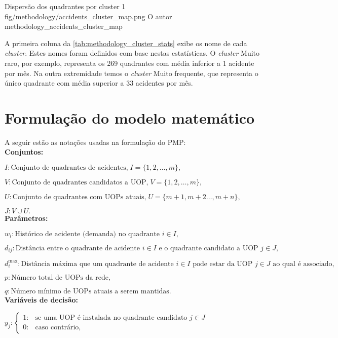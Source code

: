 \figurah
{Dispersão dos quadrantes por cluster}
{1}
{fig/methodology/accidents_cluster_map.png}
{O autor}
{methodology_accidents_cluster_map}
{}
{}

A primeira coluna da \autoref{tab:methodology_cluster_stats} exibe os nome de cada \textit{cluster}. Estes nomes foram definidos com base nestas estatísticas. O \textit{cluster} Muito raro, por exemplo, representa os 269 quadrantes com média inferior a 1 acidente por mês. Na outra extremidade temos o \textit{cluster} Muito frequente, que representa o único quadrante com média superior a 33 acidentes por mês.

\section{Formulação do modelo matemático}\label{sec:model_formulation}

A seguir estão as notações usadas na formulação do PMP: \\

\hline
\textbf{Conjuntos:}

$I \colon \text{Conjunto de quadrantes de acidentes,} \; I = \{1,2,\ldots,m\}\text{,}$

$V \colon \text{Conjunto de quadrantes candidatos a UOP,} \; V = \{1,2,\ldots,m\}\text{,}$

$U \colon \text{Conjunto de quadrantes com UOPs atuais,} \; U = \{m+1, m+2 \ldots, m + n\}\text{,}$

$J \colon V \cup U.$ \\

\hline
\textbf{Parâmetros:}

$w_i \colon \text{Histórico de acidente (demanda) no quadrante }i \in I\text{,}$

$d_{ij} \colon \text{Distância entre o quadrante de acidente }i \in I \text{ e o quadrante candidato a UOP }j \in J \text{,}$

$d_i^\text{max} \colon \text{Distância máxima que um quadrante de acidente }i \in I \text{ pode estar da UOP }j \in J\text{ ao qual é associado,}$

$p \colon \text{Número total de UOPs da rede,}$

$q \colon \text{Número mínimo de UOPs atuais a serem mantidas.}$ \\

\hline
\textbf{Variáveis de decisão:}

$
    y_j \colon
    \begin{cases}
      1: & \text{se uma UOP é instalada no quadrante candidato }j \in J \\
      0: & \text{caso contrário,}
    \end{cases}
$


